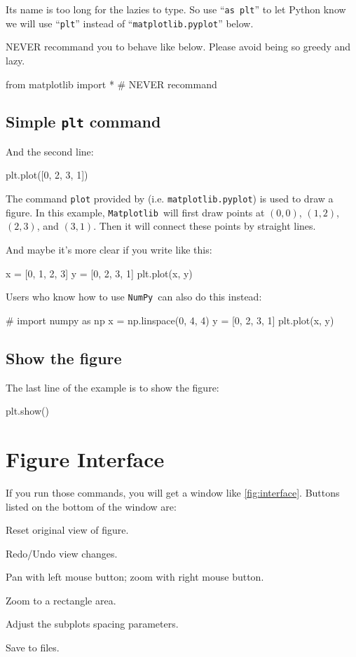 \documentclass{report}
\newcommand{\pkg}[1]{\texttt{#1}}
\newcommand{\NumPy}{\pkg{NumPy}}
\newcommand{\mpl}{\texttt{Matplotlib}}
\newcommand{\nextblock}{\vspace{2ex}}
\begin{document}
Its name is too long for the lazies to type. So use ``\texttt{as plt}'' to let Python know we will use ``\texttt{plt}'' instead of ``\texttt{matplotlib.pyplot}'' below.

NEVER recommand you to behave like below. Please avoid being so greedy and lazy.
\begin{py}
from matplotlib import * # NEVER recommand
\end{py}

\subsection{Simple \texttt{plt} command}
And the second line:
\begin{py}
plt.plot([0, 2, 3, 1])
\end{py}

The command \texttt{plot} provided by  (i.e. \texttt{matplotlib.pyplot}) is used to draw a figure. In this example, \mpl\ will first draw points at $(0,0)$, $(1,2)$, $(2,3)$, and $(3,1)$. Then it will connect these points by straight lines.

And maybe it's more clear if you write like this:
\begin{py}
x = [0, 1, 2, 3]
y = [0, 2, 3, 1]
plt.plot(x, y)
\end{py}

\nextblock Users who know how to use \NumPy\ can also do this instead:
\begin{py}
# import numpy as np
x = np.linspace(0, 4, 4)
y = [0, 2, 3, 1]
plt.plot(x, y)
\end{py}

\subsection{Show the figure}
The last line of the example is to show the figure:
\begin{py}
plt.show()
\end{py}

\section{Figure Interface}
If you run those commands, you will get a window like \autoref{fig:interface}. Buttons listed on the bottom of the window are:

\begin{description}[labelindent=.5\parindent]
\item[House:] Reset original view of figure.
\item[Arrows:] Redo/Undo view changes.
\item[Moving:] Pan with left mouse button; zoom with right mouse button.
\item[Zoom:] Zoom to a rectangle area.
\item[Subplots:] Adjust the subplots spacing parameters.
\item[Save:] Save to files. 
\end{description}
\end{document}
